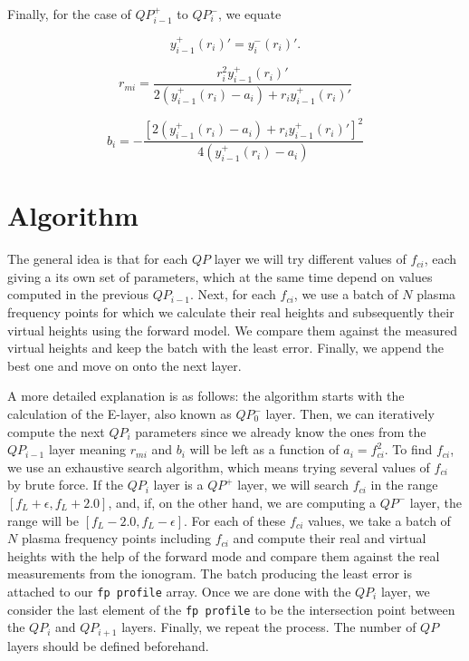\documentclass[aps,twocolumn,prb,showpacs,superscriptaddress]{revtex4-2}
\newcommand{\+}{\dagger}
\begin{document}
Finally, for the case of $QP_{i-1}^+$ to $QP_i^-$, we equate

\begin{equation}
y_{i-1}^{+}(r_i)' = y_i^{-}(r_i)'.
\end{equation}

\begin{equation}
r_{mi} = \frac{r_i^2 y_{i-1}^{+}(r_i)'}{2(y_{i-1}^+(r_i) - a_i) + r_i y_{i-1}^{+}(r_i)'}
\end{equation}

\begin{equation}
b_i = -\frac{\left[ 2(y_{i-1}^+(r_i) - a_i) + r_i y_{i-1}^{+}(r_i)' \right]^2}{4(y_{i-1}^+(r_i) - a_i)}
\end{equation}

\section{Algorithm}
The general idea is that for each $QP$ layer we will try different values of $f_{ci}$, each giving a its own set of parameters, which at the same time depend on values computed in the previous $QP_{i-1}$. Next, for each $f_{ci}$, we use a batch of $N$ plasma frequency points for which we calculate their real heights and subsequently their virtual heights using the forward model. We compare them against the measured virtual heights and keep the batch with the least error. Finally, we append the best one and move on onto the next layer. 

A more detailed explanation is as follows: the algorithm starts with the calculation of the E-layer, also known as $QP^-_0$ layer. Then, we can iteratively compute the next $QP_i$ parameters since we already know the ones from the $QP_{i-1}$ layer meaning $r_{mi}$ and $b_i$ will be left as a function of $a_i = f_{ci}^2$. To find $f_{ci}$, we use an exhaustive search algorithm, which means trying several values of $f_{ci}$ by brute force. If the $QP_i$ layer is a $QP^+$ layer, we will search $f_{ci}$ in the range $[f_L + \epsilon, f_L + 2.0]$, and, if, on the other hand, we are computing a $QP^-$ layer, the range will be $[f_L - 2.0, f_L - \epsilon]$. For each of these $f_{ci}$ values, we take a batch of $N$ plasma frequency points including $f_{ci}$ and compute their real and virtual heights with the help of the forward mode and compare them against the real measurements from the ionogram. The batch producing the least error is attached to our \texttt{fp profile} array. Once we are done with the $QP_i$ layer, we consider the last element of the \texttt{fp profile} to be the intersection point between the $QP_i$ and $QP_{i+1}$ layers. Finally, we repeat the process. The number of $QP$ layers should be defined beforehand.
\end{document}
